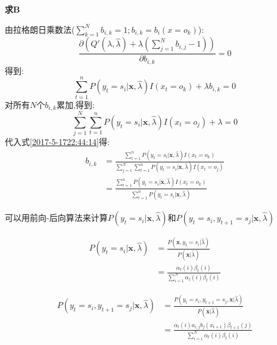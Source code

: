 \documentclass[UTF8,a4paper]{ctexart}%
\begin{document}
            \textbf{求$\bm{B}$}

            由拉格朗日乘数法($\sum_{k = 1}^N b_{i,k} = 1;b_{i,k} = b_i(x = o_k)$):
            \begin{equation}
              \frac{\partial\left( Q'(\lambda,\hat{\lambda}) + \lambda\left( \sum_{j = 1}^N b_{i,j}  - 1 \right) \right)}{\partial b_{i,k}} = 0
            \end{equation}
            得到:
            \begin{equation}
               \sum_{t = 1}^n P(y_t = s_i|\bm{x},\hat{\lambda})I(x_t = o_k)  + \lambda b_{i,k} = 0
              \label{2017-5-1722:44:14}
            \end{equation}
            对所有$N$个$b_{i,k}$累加,得到:
            \begin{equation}
              \sum_{j = 1}^N \sum_{t = 1}^n P(y_t = s_i|\bm{x},\hat{\lambda})I(x_t = o_j)  + \lambda = 0
            \end{equation}
            代入式\eqref{2017-5-1722:44:14}得:
            \begin{equation}
              \begin{split}
              b_{i,k} &= \frac{\sum_{t = 1}^n P(y_t = s_i|\bm{x},\hat{\lambda})I(x_t = o_k)}
                  {\sum_{j = 1}^N \sum_{t = 1}^n P(y_t = s_i|\bm{x},\hat{\lambda})I(x_t = o_j)}\\
              &= \frac{\sum_{t = 1}^n P(y_t = s_i|\bm{x},\hat{\lambda})I(x_t = o_k)}
              { \sum_{t = 1}^n P(y_t = s_i|\bm{x},\hat{\lambda})}
            \end{split}
            \end{equation}

            可以用前向-后向算法来计算$P(y_t = s_i|\bm{x},\hat{\lambda})$和$P(y_t = s_i , y_{t+1} = s_j|\bm{x},\hat{\lambda})$

            \begin{equation}
              \begin{split}
              P(y_t = s_i|\bm{x},\hat{\lambda}) &= \frac{P(\bm{x},y_t = s_i|\hat{\lambda})}
                {P(\bm{x}|\hat{\lambda})} \\
                &= \frac{\alpha_t(i)\beta_t(i)}{\sum_{i = 1}^N \alpha_t(i) \beta_t(i)}
              \end{split}
            \end{equation}

            \begin{equation}
              \begin{split}
              P(y_t = s_i , y_{t+1} = s_j|\bm{x},\hat{\lambda})
              &= \frac{  P(y_t = s_i , y_{t+1} = s_j,\bm{x}|\hat{\lambda})}{  P(\bm{x}|\hat{\lambda})}\\
              &= \frac{\alpha_t(i)a_{i,j}b_j(x_{t+1})\beta_{t+1}(j)}{\sum_{i = 1}^N \alpha_t(i) \beta_t(i)}
            \end{split}
            \end{equation}
\end{document}
